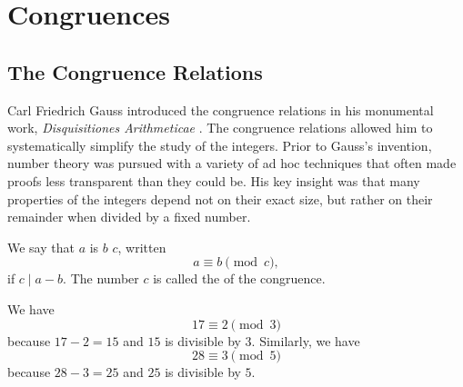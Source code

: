 \chapter{Congruences}\label{chapter:congruences}

\section{The Congruence Relations}

Carl Friedrich Gauss introduced the congruence relations in his monumental work, \emph{Disquisitiones Arithmeticae} \cite{gauss1986}. The congruence relations allowed him to systematically simplify the study of the integers. Prior to Gauss's invention, number theory was pursued with a variety of ad hoc techniques that often made proofs less transparent than they could be. His key insight was that many properties of the integers depend not on their exact size, but rather on their remainder when divided by a fixed number.

\begin{definition}
  We say that $a$ is  $b$  $c$, written
  \begin{equation*}
    a \equiv b \pmod{c},
  \end{equation*}
  if $c\mid a-b$. The number $c$ is called the  of the congruence.
\end{definition}

\begin{example}
  We have
  \begin{equation*}
    17 \equiv 2 \pmod{3}
  \end{equation*}
  because $17-2=15$ and $15$ is divisible by $3$. Similarly, we have
  \begin{equation*}
    28 \equiv 3 \pmod{5}
  \end{equation*}
  because $28-3=25$ and $25$ is divisible by $5$.
\end{example}

